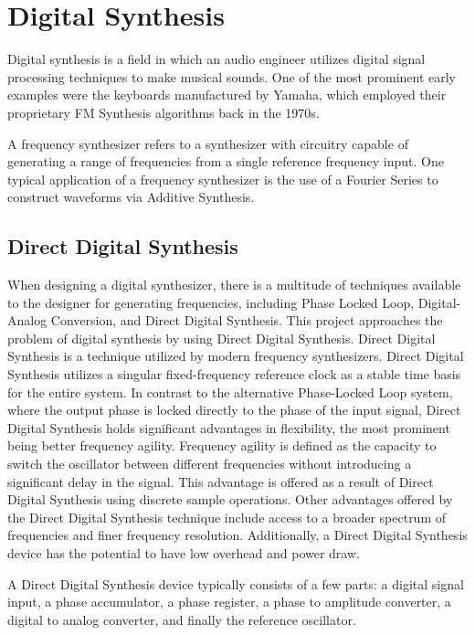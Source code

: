 \documentclass[a4paper,12pt]{report}
\begin{document}
\section{Digital Synthesis}
Digital synthesis is a field in which an audio engineer utilizes digital signal processing techniques to make musical sounds. One of the most prominent early examples were the keyboards manufactured by Yamaha, which employed their proprietary FM Synthesis algorithms back in the 1970s.

A frequency synthesizer refers to a synthesizer with circuitry capable of generating a range of frequencies from a single reference frequency input. One typical application of a frequency synthesizer is the use of a Fourier Series to construct waveforms via Additive Synthesis.

\subsection{Direct Digital Synthesis}
When designing a digital synthesizer, there is a multitude of techniques available to the designer for generating frequencies, including Phase Locked Loop, Digital-Analog Conversion, and Direct Digital Synthesis. This project approaches the problem of digital synthesis by using Direct Digital Synthesis. Direct Digital Synthesis is a technique utilized by modern frequency synthesizers. Direct Digital Synthesis utilizes a singular fixed-frequency reference clock as a stable time basis for the entire system. In contrast to the alternative Phase-Locked Loop system, where the output phase is locked directly to the phase of the input signal, Direct Digital Synthesis holds significant advantages in flexibility, the most prominent being better frequency agility. Frequency agility is defined as the capacity to switch the oscillator between different frequencies without introducing a significant delay in the signal. This advantage is offered as a result of Direct Digital Synthesis using discrete sample operations. Other advantages offered by the Direct Digital Synthesis technique include access to a broader spectrum of frequencies and finer frequency resolution. Additionally, a Direct Digital Synthesis device has the potential to have low overhead and power draw.

A Direct Digital Synthesis device typically consists of a few parts: a digital signal input, a phase accumulator, a phase register, a phase to amplitude converter, a digital to analog converter, and finally the reference oscillator.
\end{document}
